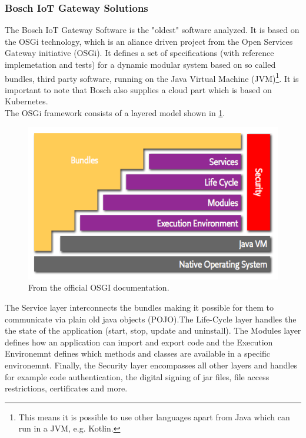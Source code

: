 \subsubsection{Bosch IoT Gateway Solutions}
The Bosch IoT Gateway Software\cite{BoschIoT13:online} is the "oldest" software analyzed. It is based on the OSGi technology\cite{osgiDefintion25:online}, which is an aliance driven project from the Open Services Gateway initiative (OSGi). It defines a set of specifications (with reference implemetation and tests) for a dynamic modular system based on so called bundles, third party software, running on the Java Virtual Machine (JVM)\footnote{This means it is possible to use other languages apart from Java which can run in a JVM, e.g. Kotlin.}. It is important to note that Bosch also supplies a cloud part which is based on Kubernetes.\\
The OSGi framework consists of a layered model shown in \cref{fig:osgiLayerModel}. 
\begin{figure}[h!]
    \centering
    \includegraphics[scale=0.8]{figures/layering-osgi.png}
    \caption{From the official OSGI documentation\cite{osgiFrameworkArchitec22:online}.}
    \label{fig:osgiLayerModel}
\end{figure}
The Service layer interconnects the bundles making it possible for them to communicate via plain old java objects (POJO).The Life-Cycle layer handles the the state of the application (start, stop, update and uninstall). The Modules layer defines how an application can import and export code and the Execution Environemnt defines which methods and classes are available in a specific environemnt. Finally, the Security layer encompasses all other layers and handles for example code authentication, the digital signing of jar files, file access restrictions, certificates and more.\\
